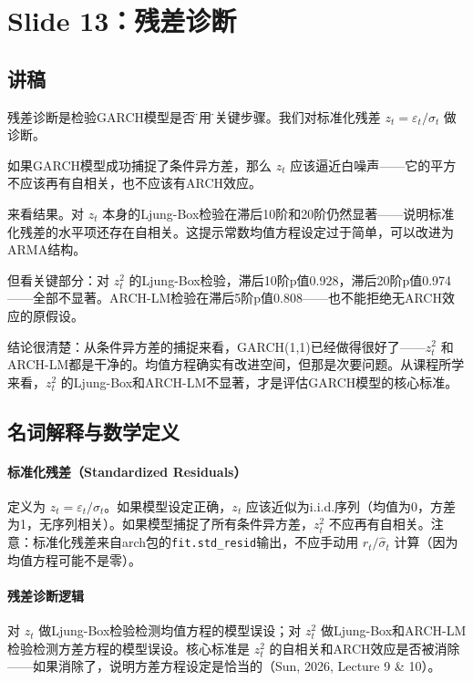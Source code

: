 \documentclass[11pt,a4paper]{article}
\begin{document}
\newpage
\section*{Slide 13：残差诊断}

\subsection*{讲稿}
残差诊断是检验GARCH模型是否\"够用\"的关键步骤。我们对标准化残差 \(z_t = \varepsilon_t / \sigma_t\) 做诊断。

如果GARCH模型成功捕捉了条件异方差，那么 \(z_t\) 应该逼近白噪声——它的平方不应该再有自相关，也不应该有ARCH效应。

来看结果。对 \(z_t\) 本身的Ljung-Box检验在滞后10阶和20阶仍然显著——说明标准化残差的水平项还存在自相关。这提示常数均值方程设定过于简单，可以改进为ARMA结构。

但看关键部分：对 \(z_t^2\) 的Ljung-Box检验，滞后10阶p值0.928，滞后20阶p值0.974——全部不显著。ARCH-LM检验在滞后5阶p值0.808——也不能拒绝无ARCH效应的原假设。

结论很清楚：从条件异方差的捕捉来看，GARCH(1,1)已经做得很好了——\(z_t^2\) 和ARCH-LM都是干净的。均值方程确实有改进空间，但那是次要问题。从课程所学来看，\(z_t^2\) 的Ljung-Box和ARCH-LM不显著，才是评估GARCH模型的核心标准。

\subsection*{名词解释与数学定义}

\paragraph{标准化残差（Standardized Residuals）} 定义为 \(z_t = \varepsilon_t / \sigma_t\)。如果模型设定正确，\(z_t\) 应该近似为i.i.d.序列（均值为0，方差为1，无序列相关）。如果模型捕捉了所有条件异方差，\(z_t^2\) 不应再有自相关。注意：标准化残差来自arch包的\texttt{fit.std\_resid}输出，不应手动用 \(r_t / \hat{\sigma}_t\) 计算（因为均值方程可能不是零）。

\paragraph{残差诊断逻辑} 对 \(z_t\) 做Ljung-Box检验检测均值方程的模型误设；对 \(z_t^2\) 做Ljung-Box和ARCH-LM检验检测方差方程的模型误设。核心标准是 \(z_t^2\) 的自相关和ARCH效应是否被消除——如果消除了，说明方差方程设定是恰当的（Sun, 2026, Lecture 9 \& 10）。
\end{document}

